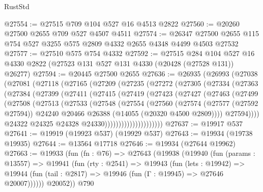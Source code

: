 \begin{lexlean}{RustStd}
\begin{coremodule}
@27554 := @27515 @709 @104 @527 @16 @4513 @2822
@27560 := @20260 @27500 @2655 @709 @527 @4507 @4511
@27574 := @26347 @27500 @2655 @115 @754 @527 @3255 @575 @2809 @4332 @2655 @4348 @4499 @4503 @27532
@27577 := @27510 @575 @754 @4332
@27592 := @27515
    @284
    @104
    @527
    @16
    @4330
    @2822
    (@27523 @131 @527 @131 @4330 (@20428 (@27528 @131)) @26277)
@27594 := @20445 @27500 @2655
@27636 := @26935
    (@26993
      (@27038
        (@27081
          (@27118
            (@27165
              (@27209
                (@27235
                  (@27272
                    (@27305
                      (@27334
                        (@27363
                          (@27384
                            (@27399
                              (@27411
                                (@27415
                                  (@27419
                                    (@27423
                                      (@27427
                                        (@27463
                                          (@27499
                                            (@27508
                                              (@27513
                                                (@27533
                                                  (@27548
                                                    (@27554
                                                      (@27560
                                                        (@27574
                                                          (@27577 (@27592 @27594))
                                                          @24240
                                                          @20466
                                                          @26388
                                                          (@14055 (@20320 @4500 @2809))))
                                                      @27594))))
                                              @24322
                                              @24325
                                              @24328
                                              @24330)))))))))))))))))))))
@27637 := @19917 @537
@27641 := @19919 (@19923 @537) (@19929 @537)
@27643 := @19934 (@19738 @19935)
@27644 := @13564 @17718
@27646 := @19934 (@27644 @19962)
@27663 := @19933
    (fun (fn : @76) =>
    @27643
      (@19938
        (@19940
          (fun (params : @13557) =>
          @19941
            (fun (rty : @2541) =>
            @19943
              (fun (lets : @19942) =>
              @19944 (fun (tail : @2817) => @19946 (fun (Γ : @19945) => @27646 @20007))))))
        @20052))
    @790

\end{coremodule}
\end{lexlean}
